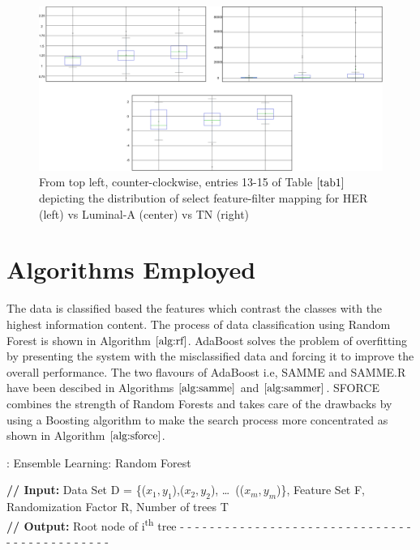 \documentclass[10pt,final,1p,times,twocolumn]{elsarticle}
\begin{document}
\begin{figure}[hbt!]
\centering
\includegraphics[width=14cm]{t_13-15.png}
\caption{From top left, counter-clockwise, entries 13-15 of Table $\ref{tab1}$ depicting the distribution of select feature-filter mapping for HER (left) vs Luminal-A (center) vs TN (right)}
\label{t_13-15}
\end{figure}

\section{Algorithms Employed}

The data is classified based the features which contrast the classes with the highest information content. The process of data classification using Random Forest is shown in Algorithm $\ref{alg:rf}$. AdaBoost solves the problem of overfitting by presenting the system with the misclassified data and forcing it to improve the overall performance. The two flavours of AdaBoost i.e, SAMME and SAMME.R have been descibed in Algorithms $\ref{alg:samme}$ and $\ref{alg:sammer}$. SFORCE combines the strength of Random Forests and takes care of the  drawbacks by using a Boosting algorithm to make the search process more concentrated as shown in Algorithm $\ref{alg:sforce}$. 


\begin{algorithm}[!t]
\caption{: Ensemble Learning: Random Forest}\label{alg:rf}
\begin{algorithmic}[1]
\footnotesize
\STATE \textbf{// Input:} Data Set D = \{(\(x_1, y_1\)),(\(x_2, y_2\)), \dots\, ((\(x_m, y_m\))\}, Feature Set F, Randomization Factor R, Number of trees T 
\\\textbf{// Output:} Root node of i\textsuperscript{th} tree
\STATE - - - - - - - - - - - - - - - - - - - - - - - - - - - - - - - - - - - - - - - - - - - - -
\ENDIF
{}  
\ENDFOR
\ENDFOR
{}
\end{algorithmic}
\end{algorithm}
\end{document}
